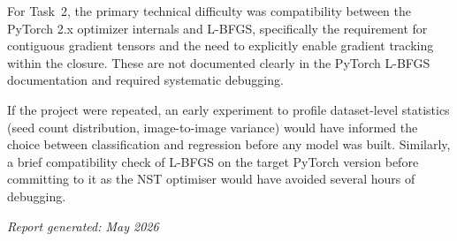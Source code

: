 \documentclass[11pt,a4paper]{article}
\begin{document}
For Task~2, the primary technical difficulty was compatibility between the PyTorch 2.x
optimizer internals and L-BFGS, specifically the requirement for contiguous gradient
tensors and the need to explicitly enable gradient tracking within the closure. These are
not documented clearly in the PyTorch L-BFGS documentation and required systematic
debugging.

If the project were repeated, an early experiment to profile dataset-level statistics
(seed count distribution, image-to-image variance) would have informed the choice between
classification and regression before any model was built. Similarly, a brief compatibility
check of L-BFGS on the target PyTorch version before committing to it as the NST
optimiser would have avoided several hours of debugging.

\bigskip
\begin{flushright}
\textit{Report generated: May 2026}
\end{flushright}
\end{document}
